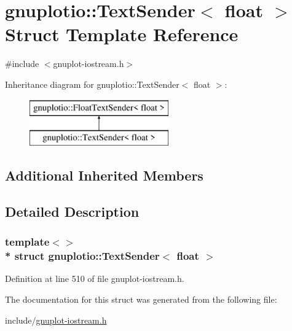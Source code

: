 \hypertarget{structgnuplotio_1_1_text_sender_3_01float_01_4}{}\section{gnuplotio\+:\+:Text\+Sender$<$ float $>$ Struct Template Reference}
\label{structgnuplotio_1_1_text_sender_3_01float_01_4}


{\ttfamily \#include $<$gnuplot-\/iostream.\+h$>$}

Inheritance diagram for gnuplotio\+:\+:Text\+Sender$<$ float $>$\+:\begin{figure}[H]
\begin{center}
\leavevmode
\includegraphics[height=2.000000cm]{structgnuplotio_1_1_text_sender_3_01float_01_4}
\end{center}
\end{figure}
\subsection*{Additional Inherited Members}


\subsection{Detailed Description}
\subsubsection*{template$<$$>$\\*
struct gnuplotio\+::\+Text\+Sender$<$ float $>$}



Definition at line 510 of file gnuplot-\/iostream.\+h.



The documentation for this struct was generated from the following file\+:\begin{DoxyCompactItemize}
\item 
include/\hyperlink{gnuplot-iostream_8h}{gnuplot-\/iostream.\+h}\end{DoxyCompactItemize}
